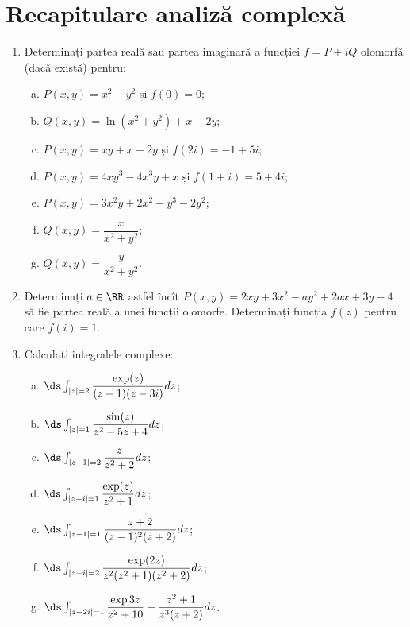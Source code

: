 
\chapter{Recapitulare analiză complexă}

\begin{enumerate}[(1)]
    \item Determinați partea reală sau partea imaginară a funcției $ f = P + iQ $ olomorfă (dacă există) pentru:
    \begin{enumerate}[(a)]
        \item $ P(x, y) = x^2 - y^2 $ și $ f(0) = 0 $;
        \item $ Q(x, y) = \ln(x^2 + y^2) + x - 2y $;
        \item $ P(x, y) = xy + x + 2y $ și $ f(2i) = -1 + 5i $;
        \item $ P(x, y) = 4xy^3 - 4x^3y + x $ și $ f(1 + i) = 5 + 4i $;
        \item $ P(x, y) = 3x^2y + 2x^2 - y^3 - 2y^2 $;
        \item $ Q(x, y) = \dfrac{x}{x^2 + y^2} $;
        \item $ Q(x, y) = \dfrac{y}{x^2 + y^2} $.
    \end{enumerate}
    \item Determinați $ a \in \RR $ astfel încît $ P(x, y) = 2xy + 3x^2 - ay^2 + 2ax + 3y - 4 $
    să fie partea reală a unei funcții olomorfe. Determinați funcția $ f(z) $ pentru care $ f(i) = 1 $.
    \item Calculați integralele complexe:
    \begin{enumerate}[(a)]
        \item $ \ds\int_{|z| = 2} \dfrac{\exp(z)}{(z - 1)(z - 3i)} dz $;
        \item $ \ds\int_{|z| = 1} \dfrac{\sin(z)}{z^2 - 5z + 4} dz $;
        \item $ \ds\int_{|z - 1| = 2} \dfrac{z}{z^2 + 2} dz $;
        \item $ \ds\int_{|z - i| = 1} \dfrac{\exp(z)}{z^2 + 1} dz $;
        \item $ \ds\int_{|z - 1| = 1} \dfrac{z + 2}{(z - 1)^2(z + 2)} dz $;
        \item $ \ds\int_{|z + i| = 2} \dfrac{\exp(2z)}{z^2(z^2 + 1)(z^2 + 2)} dz $;
        \item $ \ds\int_{|z - 2i| = 1} \dfrac{\exp{3z}}{z^2 + 10} + \dfrac{z^2 + 1}{z^3(z + 2)} dz $.
    \end{enumerate}

\end{enumerate}
